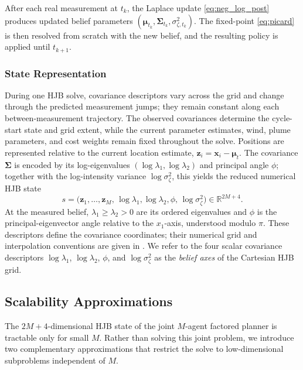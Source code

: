 \documentclass{article}
\newcommand{\R}{\mathbb{R}}
\newcommand{\bs}[1]{\boldsymbol{#1}}
\newcommand{\x}{\mathbf{x}}
\newcommand{\z}{\mathbf{z}}
\begin{document}

After each real measurement at $t_k$, the Laplace update \eqref{eq:neg_log_post} produces updated belief parameters $(\bs\mu_{t_k},\bs\Sigma_{t_k},\sigma_{\zeta,t_k}^2)$.
The fixed-point \eqref{eq:picard} is then resolved from scratch with the new belief, and the resulting policy is applied until $t_{k+1}$.

\subsubsection{State Representation}

During one HJB solve, covariance descriptors vary across the grid and change through the predicted measurement jumps; they remain constant along each between-measurement trajectory.
The observed covariances determine the cycle-start state and grid extent, while the current parameter estimates, wind, plume parameters, and cost weights remain fixed throughout the solve.
Positions are represented relative to the current location estimate, $\z_i=\x_i-\bs\mu_t$.
The covariance $\bs\Sigma$ is encoded by its log-eigenvalues $(\log\lambda_1,\log\lambda_2)$ and principal angle $\phi$; together with the log-intensity variance $\log\sigma_\zeta^2$, this yields the reduced numerical HJB state
\begin{equation}
s=\bigl(\z_1,\ldots,\z_M,\,\log\lambda_1,\log\lambda_2,\phi,\,\log\sigma_\zeta^2\bigr)
\in\R^{2M+4}.
\end{equation}
At the measured belief, $\lambda_1\ge\lambda_2>0$ are its ordered eigenvalues and $\phi$ is the principal-eigenvector angle relative to the $x_1$-axis, understood modulo $\pi$.
These descriptors define the covariance coordinates; their numerical grid and interpolation conventions are given in .
We refer to the four scalar covariance descriptors
$\log\lambda_1$, $\log\lambda_2$, $\phi$, and $\log\sigma_\zeta^2$ as the \emph{belief axes} of the Cartesian HJB grid.

\subsection{Scalability Approximations}
\label{sec:scalability}

The $2M+4$-dimensional HJB state of the joint $M$-agent factored planner is tractable only for small $M$.
Rather than solving this joint problem, we introduce two complementary approximations that restrict the solve to low-dimensional subproblems independent of $M$.
\end{document}
